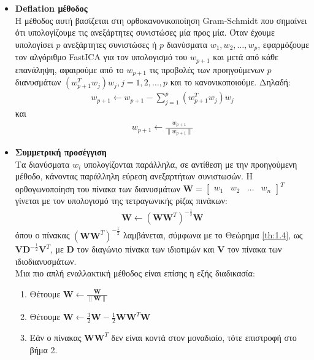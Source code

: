 \begin{itemize}
    \item \textbf{\en Deflation \gr μέθοδος}
    \\ 
    Η μέθοδος αυτή βασίζεται στη ορθοκανονικοποίηση \en Gram-Schmidt \cite{gram-smidt:11} \gr που σημαίνει ότι υπολογίζουμε τις ανεξάρτητες συνιστώσες μία προς μία. Όταν έχουμε υπολογίσει \en $p$ \gr ανεξάρτητες συνιστώσες ή \en $p$ \gr διανύσματα \en $w_1, w_2, \ldots, w_p$, \gr εφαρμόζουμε τον αλγόριθμο \en FastICA \gr για τον υπολογισμό του \en $w_{p+1}$ \gr και μετά από κάθε επανάληψη, αφαιρούμε από το \en $w_{p+1}$ \gr τις προβολές των προηγούμενων \en $p$ \gr διανυσμάτων \en $ \left ( w_{p+1}^T w_{j} \right ) w_{j} , j = 1, 2, \ldots, p$ \gr και το κανονικοποιούμε. Δηλαδή: \en
    \begin{align} \label{eq:3.3.2}
        w_{p+1} \leftarrow w_{p+1} - \sum\limits_{j=1}^{p} \left( w_{p+1}^T w_j  \right)w_j
    \end{align}
    \gr και \en
    \begin{align} \label{eq:3.3.3}
        w_{p+1} \leftarrow \frac{w_{p+1}} { \parallel w_{p+1} \parallel }
    \end{align}
    \gr
    \newpage
    \item \textbf{Συμμετρική προσέγγιση}
    \\
    Τα διανύσματα \en $w_i$ \gr υπολογίζονται παράλληλα, σε αντίθεση με την προηγούμενη μέθοδο, κάνοντας παράλληλη εύρεση ανεξαρτήτων συνιστωσών. Η ορθογωνοποίηση του πίνακα των διανυσμάτων \en $\mathbf{W} = \begin{bmatrix}
    w_1 & w_2 & \ldots & w_n \end{bmatrix}^T$ \gr γίνεται με τον υπολογισμό της τετραγωνικής ρίζας πινάκων: \en
    \begin{align} \label{3.3.4}
        \mathbf{W} \leftarrow \left ( \mathbf{W} \mathbf{W}^T  \right ) ^{-\frac{1}{2}} \mathbf{W}
    \end{align}
    \gr όπου ο πίνακας \en $ \left ( \mathbf{W} \mathbf{W}^T  \right )^{-\frac{1}{2}} $ \gr λαμβάνεται, σύμφωνα με το Θεώρημα \ref{th:1.4}, ως \en $\mathbf{V} \mathbf{D}^{-\frac{1}{2}} \mathbf{V}^T$, \gr με \en $\mathbf{D}$ \gr τον διαγώνιο πίνακα των ιδιοτιμών και \en $\mathbf{V}$ τον πίνακα των ιδιοδιανυσμάτων.
    \\ 
    Μια πιο απλή εναλλακτική μέθοδος είναι επίσης η εξής διαδικασία:
    \begin{enumerate}
        \item Θέτουμε \en $\mathbf{W} \leftarrow \frac{\mathbf{W}}{\parallel \mathbf{W} \parallel}$  \gr
        \item Θέτουμε \en $\mathbf{W} \leftarrow \frac{3}{2} \mathbf{W} - \frac{1}{2} \mathbf{W} \mathbf{W}^T  \mathbf{W}$ \gr 
        \item Εάν ο πίνακας \en $\mathbf{W} \mathbf{W}^T $ \gr δεν είναι κοντά στον μοναδιαίο, τότε επιστροφή στο βήμα 2.
    \end{enumerate}
\end{itemize}

